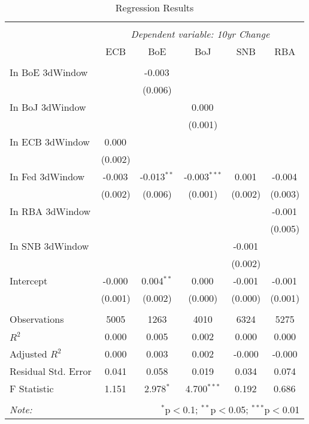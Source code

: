 \begin{table}[!htbp] \centering
  \caption{Regression Results}
\begin{tabular}{@{\extracolsep{5pt}}lccccc}
\\[-1.8ex]\hline
\hline \\[-1.8ex]
& \multicolumn{5}{c}{\textit{Dependent variable: 10yr Change}} \
\cr \cline{2-6}
\\[-1.8ex] & \multicolumn{1}{c}{ECB} & \multicolumn{1}{c}{BoE} & \multicolumn{1}{c}{BoJ} & \multicolumn{1}{c}{SNB} & \multicolumn{1}{c}{RBA}  \\
\hline \\[-1.8ex]
 In BoE 3dWindow & & -0.003$^{}$ & & & \\
& & (0.006) & & & \\
 In BoJ 3dWindow & & & 0.000$^{}$ & & \\
& & & (0.001) & & \\
 In ECB 3dWindow & 0.000$^{}$ & & & & \\
& (0.002) & & & & \\
 In Fed 3dWindow & -0.003$^{}$ & -0.013$^{**}$ & -0.003$^{***}$ & 0.001$^{}$ & -0.004$^{}$ \\
& (0.002) & (0.006) & (0.001) & (0.002) & (0.003) \\
 In RBA 3dWindow & & & & & -0.001$^{}$ \\
& & & & & (0.005) \\
 In SNB 3dWindow & & & & -0.001$^{}$ & \\
& & & & (0.002) & \\
 Intercept & -0.000$^{}$ & 0.004$^{**}$ & 0.000$^{}$ & -0.001$^{}$ & -0.001$^{}$ \\
& (0.001) & (0.002) & (0.000) & (0.000) & (0.001) \\
\hline \\[-1.8ex]
 Observations & 5005 & 1263 & 4010 & 6324 & 5275 \\
 $R^2$ & 0.000 & 0.005 & 0.002 & 0.000 & 0.000 \\
 Adjusted $R^2$ & 0.000 & 0.003 & 0.002 & -0.000 & -0.000 \\
 Residual Std. Error & 0.041 & 0.058 & 0.019 & 0.034 & 0.074 \\
 F Statistic & 1.151$^{}$ & 2.978$^{*}$ & 4.700$^{***}$ & 0.192$^{}$ & 0.686$^{}$ \\
\hline
\hline \\[-1.8ex]
\textit{Note:} & \multicolumn{5}{r}{$^{*}$p$<$0.1; $^{**}$p$<$0.05; $^{***}$p$<$0.01} \\
\end{tabular}
\end{table}